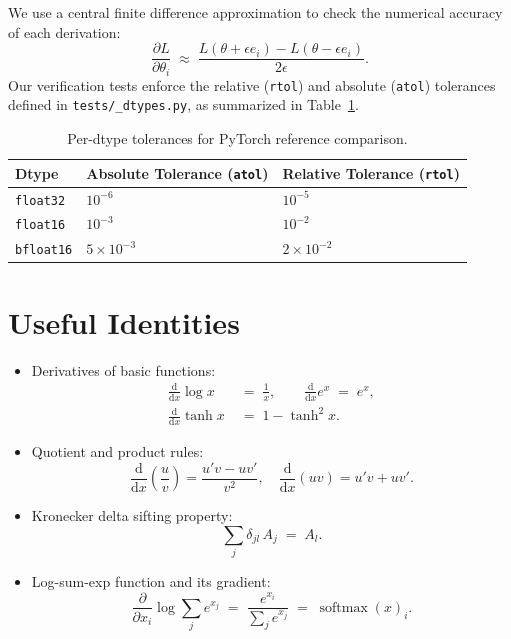 \documentclass[letterpaper, 10 pt, conference]{ieeeconf}
\newcommand{\pdv}[2]{\frac{\partial #1}{\partial #2}}
\newcommand{\dv}[2]{\frac{\mathrm{d} #1}{\mathrm{d} #2}}
\newcommand{\kron}[2]{\delta_{#1 #2}}
\DeclareMathOperator{\softmax}{softmax}
\theoremstyle{definition}
\begin{document}
We use a central finite difference approximation to check the numerical accuracy of each derivation:
\begin{equation}
  \pdv{L}{\theta_i} \;\approx\;
  \frac{L(\theta + \epsilon e_i) - L(\theta - \epsilon e_i)}{2\epsilon}.
\end{equation}
Our verification tests enforce the relative (\texttt{rtol}) and absolute (\texttt{atol}) tolerances defined in \texttt{tests/\_dtypes.py}, as summarized in Table~\ref{tab:tolerances}.

\begin{table}[h]
  \centering
  \caption{Per-dtype tolerances for PyTorch reference comparison.}
  \label{tab:tolerances}
  \begin{tabular}{@{}lll@{}}
    \toprule
    Dtype             & Absolute Tolerance (\texttt{atol}) & Relative Tolerance (\texttt{rtol}) \\
    \midrule
    \texttt{float32}  & $10^{-6}$                          & $10^{-5}$                          \\
    \texttt{float16}  & $10^{-3}$                          & $10^{-2}$                          \\
    \texttt{bfloat16} & $5 \times 10^{-3}$                 & $2 \times 10^{-2}$                 \\
    \bottomrule
  \end{tabular}
\end{table}

\section{Useful Identities}\label{app:identities}

\begin{itemize}
  \item Derivatives of basic functions:
        \begin{align*}
          \dv{}{x}\log x \;  & =\; \frac{1}{x}, \qquad \dv{}{x} e^{x} \;=\; e^{x}, \\
          \dv{}{x}\tanh x \; & =\; 1 - \tanh^2 x.
        \end{align*}
  \item Quotient and product rules:
        \begin{equation*}
          \dv{}{x}\left(\frac{u}{v}\right) = \frac{u'v - uv'}{v^2}, \quad
          \dv{}{x}(uv) = u'v + uv'.
        \end{equation*}
  \item Kronecker delta sifting property:
        \begin{equation*}
          \sum_j \kron{j}{l}\,A_j \;=\; A_l.
        \end{equation*}
  \item Log-sum-exp function and its gradient:
        \begin{equation*}
          \pdv{}{x_i} \log \sum_j e^{x_j} \;=\; \frac{e^{x_i}}{\sum_j e^{x_j}} \;=\; \softmax(x)_i.
        \end{equation*}
\end{itemize}
\end{document}
